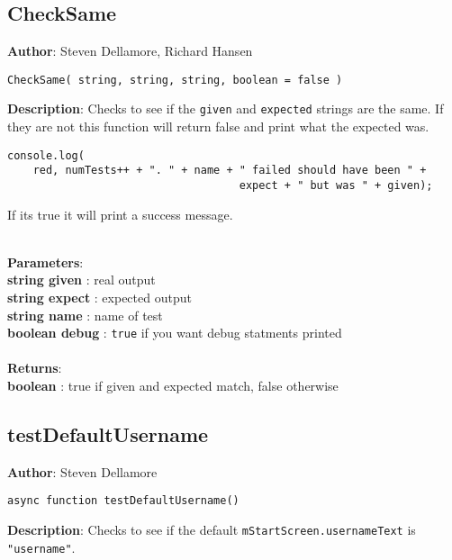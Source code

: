 \documentclass[12pt]{article}
\begin{document}
\subsection{CheckSame}
\textbf{Author}: Steven Dellamore, Richard Hansen 
\vspace*{1\baselineskip}
\begin{lstlisting}
CheckSame( string, string, string, boolean = false )
\end{lstlisting} 
\vspace*{1\baselineskip}
\textbf{Description}: Checks to see if the \texttt{given} and \texttt{expected} strings are the same. If they are not this function will return false and print what the expected was. 
\begin{verbatim}
console.log(
    red, numTests++ + ". " + name + " failed should have been " + 
                                    expect + " but was " + given);
\end{verbatim}
 If its true it will print a success message. 


\textbf{\large{\\Parameters}}:\\
\textbf{string given }: real output\\
\textbf{string expect }: expected output\\
\textbf{string name }: name of test\\
\textbf{boolean debug }: \texttt{true} if you want debug statments printed\\\textbf{\large{\\Returns}}:\\\textbf{boolean }: true if given and expected match, false otherwise

\subsection{testDefaultUsername}
\textbf{Author}: Steven Dellamore 
\vspace*{1\baselineskip}
\begin{lstlisting}
async function testDefaultUsername()
\end{lstlisting} 
\vspace*{1\baselineskip}
\textbf{Description}: Checks to see if the default \texttt{mStartScreen.usernameText} is \texttt{"username"}. 
\end{document}
